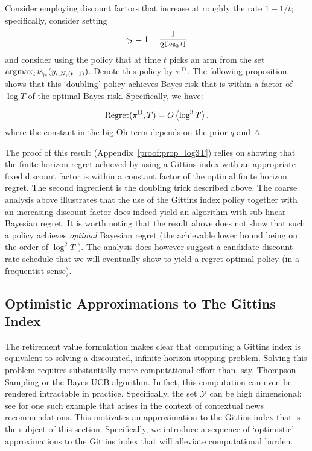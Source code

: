 Consider employing discount factors that increase at roughly the rate $1 - 1/t$; specifically, consider setting 
\[
\gamma_t = 
1 - 
\frac{1}
{2^{\floor{\log_2 t}}}%
\]
and consider using the policy that at time $t$ picks an arm from the set $\operatorname*{\mathrm{argmax}}_i \nu_{\gamma_t}(y_{i,N_i(t-1)})$. Denote this policy by $\pi^{\rm D}$. The following proposition shows that this `doubling' policy achieves Bayes risk that is within a factor of $\log T$ of the optimal Bayes risk. Specifically, we have:
\begin{proposition}
	\label{prop:gittins_log3T}
	\[
	{\rm Regret}(\pi^{\rm D},T)
	=
	O
	\left(
	\log^3 T
	\right).
	\] 
	where the constant in the big-Oh term depends on the prior $q$ and $A$.
\end{proposition}
The proof of this result (Appendix~\ref{proof:prop_log3T}) relies on showing that the finite horizon regret achieved by using a Gittins index with an appropriate fixed discount factor is within a constant factor of the optimal finite horizon regret. The second ingredient is the doubling trick described above. The coarse analysis above illustrates that the use of the Gittins index policy together with an increasing discount factor does indeed yield an algorithm with sub-linear Bayesian regret. It is worth noting that the result above does not show that such a policy achieves {\em optimal} Bayesian regret (the achievable lower bound being on the order of $\log^2T$ \citep{lai1987adaptive}). The analysis does however suggest a candidate discount rate schedule that we will eventually show to yield a regret optimal policy (in a frequentist sense). 
 
\subsection{Optimistic Approximations to The Gittins Index}\label{sec:approx_agi_deriv}

The retirement value formulation makes clear that computing a Gittins index is equivalent to solving a discounted, infinite horizon stopping problem. Solving this problem requires substantially more computational effort than, say, Thompson Sampling or the Bayes UCB algorithm. In fact, this computation can even be rendered intractable in practice. Specifically, the set $\mathcal Y$ can be high dimensional; see \citep{chapelle2011empirical} for one such example that arises in the context of contextual news recommendations. This motivates an approximation to the Gittins index that is the subject of this section. Specifically, we introduce a sequence of `optimistic' approximations to the Gittins index that will alleviate computational burden. 

